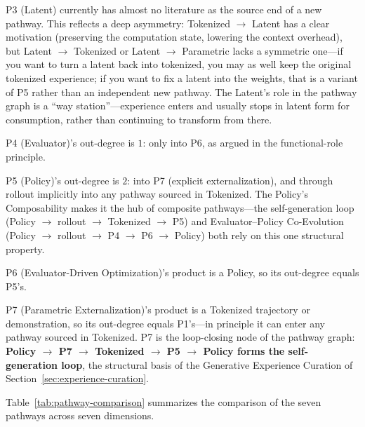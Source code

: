 P3 (Latent) currently has almost no literature as the source end of a new pathway. This reflects a deep asymmetry: Tokenized $\rightarrow$ Latent has a clear motivation (preserving the computation state, lowering the context overhead), but Latent $\rightarrow$ Tokenized or Latent $\rightarrow$ Parametric lacks a symmetric one---if you want to turn a latent back into tokenized, you may as well keep the original tokenized experience; if you want to fix a latent into the weights, that is a variant of P5 rather than an independent new pathway. The Latent's role in the pathway graph is a ``way station''---experience enters and usually stops in latent form for consumption, rather than continuing to transform from there.

P4 (Evaluator)'s out-degree is $1$: only into P6, as argued in the functional-role principle.

P5 (Policy)'s out-degree is $2$: into P7 (explicit externalization), and through rollout implicitly into any pathway sourced in Tokenized. The Policy's Composability makes it the hub of composite pathways---the self-generation loop (Policy $\rightarrow$ rollout $\rightarrow$ Tokenized $\rightarrow$ P5) and Evaluator--Policy Co-Evolution (Policy $\rightarrow$ rollout $\rightarrow$ P4 $\rightarrow$ P6 $\rightarrow$ Policy) both rely on this one structural property.

P6 (Evaluator-Driven Optimization)'s product is a Policy, so its out-degree equals P5's.

P7 (Parametric Externalization)'s product is a Tokenized trajectory or demonstration, so its out-degree equals P1's---in principle it can enter any pathway sourced in Tokenized. P7 is the loop-closing node of the pathway graph: \textbf{Policy $\rightarrow$ P7 $\rightarrow$ Tokenized $\rightarrow$ P5 $\rightarrow$ Policy forms the self-generation loop}, the structural basis of the Generative Experience Curation of Section~\ref{sec:experience-curation}.

Table~\ref{tab:pathway-comparison} summarizes the comparison of the seven pathways across seven dimensions.


